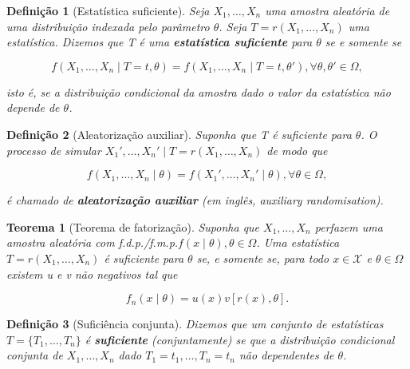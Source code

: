 \documentclass{article}
\newtheorem{theorem}{Teorema}
\newtheorem{definition}{Definição}
\begin{document}
\begin{definition}[Estatística suficiente]
Seja $X_1, \ldots, X_n$ uma amostra aleatória de uma distribuição indexada pelo parâmetro $\theta$. Seja $T = r(X_1, \ldots, X_n)$ uma estatística. Dizemos que T é uma \textbf{estatística suficiente} para $\theta$ se e somente se

\begin{equation}
    f(X_1, \ldots, X_n \mid T = t, \theta) = f(X_1, \ldots, X_n \mid T = t, \theta'), \forall \theta, \theta' \in \Omega,
\end{equation}

isto é, se a distribuição condicional da amostra dado o valor da estatística não depende de $\theta$.
\end{definition}

\begin{definition}[Aleatorização auxiliar]
 Suponha que T é suficiente para $\theta$. O processo de simular $X_1', \ldots, X_n' \mid T = r(X_1, \ldots, X_n)$ de modo que 
 
 \begin{equation}
     f(X_1, \ldots, X_n \mid \theta) = f(X_1', \ldots, X_n' \mid \theta), \forall \theta \in \Omega,
 \end{equation}
 
 é chamado de \textbf{aleatorização auxiliar} (em inglês, auxiliary randomisation).
\end{definition}

\begin{theorem}[Teorema de fatorização]\label{teo:fatorizacao}
Suponha que $X_1, \ldots, X_n$ perfazem uma amostra aleatória com f.d.p./f.m.p.$f(x \mid \theta), \theta \in \Omega$. Uma estatística $T = r(X_1, \ldots, X_n)$ é suficiente para $\theta$ se, e somente se, para todo $x \in \mathcal{X}$ e $\theta \in \Omega$ existem u e v não negativos tal que

\begin{equation}
    f_n(x \mid \theta) = u(x) v[r(x), \theta].
\end{equation}
\end{theorem}

\begin{definition}[Suficiência conjunta]
Dizemos que um conjunto de estatísticas $T = \{T_1, \ldots, T_n\}$ é \textbf{suficiente} (conjuntamente) se que a distribuição condicional conjunta de $X_1, \ldots, X_n$ dado $T_1 = t_1, \ldots, T_n = t_n$ não dependentes de $\theta$.
\end{definition}
\end{document}
